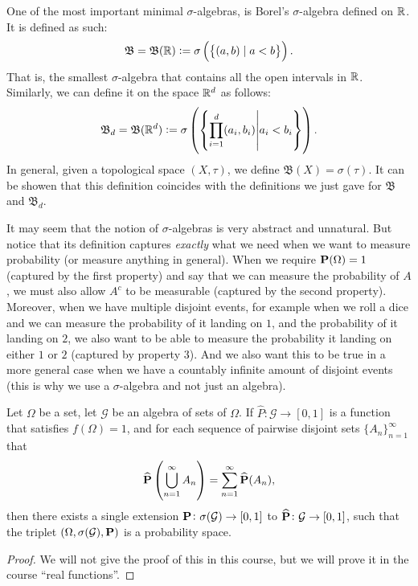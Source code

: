 \documentclass[11pt,a4paper]{article}
\begin{document}
\begin{example}
  One of the most important minimal $\sigma$-algebras, is Borel's 
  $\sigma$-algebra defined on $\mathbb{R}$. It is defined as such:
  \[
    \mathfrak B =
    \mathfrak B(\mathbb{R}) :=
    \sigma\left(\left\{(a,b) \mid a < b\right\}\right).
  \]
  That is, the smallest $\sigma$-algebra that contains all the open 
  intervals in $\mathbb{R}$. Similarly, we can define it on the space $\mathbb{R}^d$
  as follows:
  \[
    \mathfrak B_d =
    \mathfrak B(\mathbb{R}^d) :=
    \sigma\left(\left\{\prod_{i=1}^{d}(a_i,b_i) \middle\vert a_i < b_i\right\}\right).
  \]
  In general, given a topological space $(X,\tau)$,
  we define $\mathfrak B(X) = \sigma(\tau)$.
  It can be showen that this definition coincides with
  the definitions we just gave for $\mathfrak B$ and $\mathfrak B_d$.
\end{example}

\begin{remark}
  It may seem that the notion of $\sigma$-algebras is very abstract
  and unnatural.
  But notice that its definition captures \textit{exactly} what we need
  when we want to measure probability (or measure anything in general).
  When we require $\mathbf{P}(\Omega) = 1$ (captured by the first property)
  and say that we can measure the probability of $A$,
  we must also allow $A^c$ to be measurable (captured by the second property).
  Moreover, when we have multiple disjoint events, for example when we roll
  a dice and we can measure the probability of it landing on $1$,
  and the probability of it landing on $2$,
  we also want to be able to measure the probability it landing on either
  $1$ or $2$ (captured by property $3$).
  And we also want this to be true in a more general case
  when we have a countably infinite amount of disjoint events
  (this is why we use a $\sigma$-algebra and not just an algebra).
\end{remark}

\begin{theorem}
  \label{thm:cath}
  Let $\Omega$ be a set, let $\mathcal G$ be an algebra of sets of $\Omega$.
  If $\widehat{P} \colon \mathcal G \to [0,1]$ is a function that satisfies
  $f(\Omega) = 1$, and for each sequence of pairwise disjoint sets
  $\{A_n\}_{n=1}^{\infty}$ that
    \[
      \widehat{\mathbf{P}} \left(\bigcup_{n=1}^{\infty}{A_n}\right) = 
      \sum_{n=1}^{\infty}{\widehat{\mathbf{P}}(A_n)},
    \]
  then there exists a single extension 
  $\mathbf{P} \colon \sigma(\mathcal G) \to [0,1]$ to 
  $\widehat{\mathbf{P}} \colon \mathcal G \to [0,1]$, such that the triplet
  $(\Omega, \sigma(\mathcal G), \mathbf{P})$ is a probability space.
\end{theorem}
\begin{proof}
  We will not give the proof of this in this course,
  but we will prove it in the course ``real functions''.
\end{proof}
\end{document}
